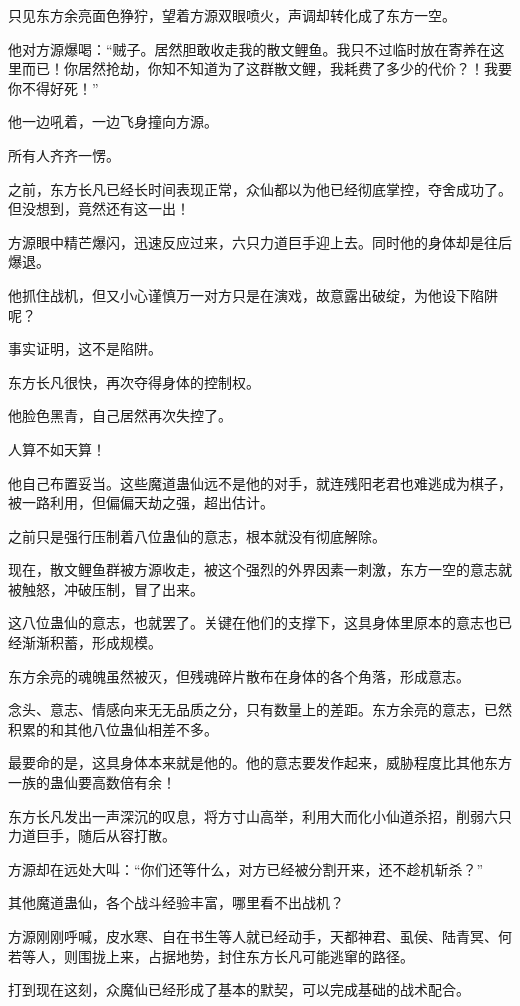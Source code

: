 \begin{this_body}
只见东方余亮面色狰狞，望着方源双眼喷火，声调却转化成了东方一空。

他对方源爆喝：“贼子。居然胆敢收走我的散文鲤鱼。我只不过临时放在寄养在这里而已！你居然抢劫，你知不知道为了这群散文鲤，我耗费了多少的代价？！我要你不得好死！”

他一边吼着，一边飞身撞向方源。

所有人齐齐一愣。

之前，东方长凡已经长时间表现正常，众仙都以为他已经彻底掌控，夺舍成功了。但没想到，竟然还有这一出！

方源眼中精芒爆闪，迅速反应过来，六只力道巨手迎上去。同时他的身体却是往后爆退。

他抓住战机，但又小心谨慎万一对方只是在演戏，故意露出破绽，为他设下陷阱呢？

事实证明，这不是陷阱。

东方长凡很快，再次夺得身体的控制权。

他脸色黑青，自己居然再次失控了。

人算不如天算！

他自己布置妥当。这些魔道蛊仙远不是他的对手，就连残阳老君也难逃成为棋子，被一路利用，但偏偏天劫之强，超出估计。

之前只是强行压制着八位蛊仙的意志，根本就没有彻底解除。

现在，散文鲤鱼群被方源收走，被这个强烈的外界因素一刺激，东方一空的意志就被触怒，冲破压制，冒了出来。

这八位蛊仙的意志，也就罢了。关键在他们的支撑下，这具身体里原本的意志也已经渐渐积蓄，形成规模。

东方余亮的魂魄虽然被灭，但残魂碎片散布在身体的各个角落，形成意志。

念头、意志、情感向来无无品质之分，只有数量上的差距。东方余亮的意志，已然积累的和其他八位蛊仙相差不多。

最要命的是，这具身体本来就是他的。他的意志要发作起来，威胁程度比其他东方一族的蛊仙要高数倍有余！

东方长凡发出一声深沉的叹息，将方寸山高举，利用大而化小仙道杀招，削弱六只力道巨手，随后从容打散。

方源却在远处大叫：“你们还等什么，对方已经被分割开来，还不趁机斩杀？”

其他魔道蛊仙，各个战斗经验丰富，哪里看不出战机？

方源刚刚呼喊，皮水寒、自在书生等人就已经动手，天都神君、虱侯、陆青冥、何若等人，则围拢上来，占据地势，封住东方长凡可能逃窜的路径。

打到现在这刻，众魔仙已经形成了基本的默契，可以完成基础的战术配合。


\end{this_body}
